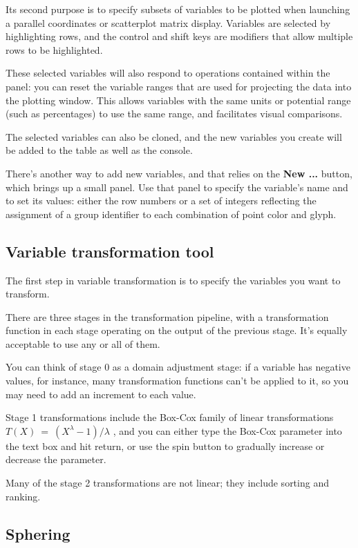 \documentclass[11pt]{article}
\def\Widget#1{\textbf{#1}}
\begin{document}
Its second purpose is to specify subsets of variables to be plotted
when launching a parallel coordinates or scatterplot matrix display.
Variables are selected by highlighting rows, and the control and shift
keys are modifiers that allow multiple rows to be highlighted.

These selected variables will also respond to operations contained
within the panel:  you can reset the variable ranges that are used
for projecting the data into the plotting window.  This allows
variables with the same units or potential range (such as percentages)
to use the same range, and facilitates visual comparisons.

The selected variables can also be cloned, and the new variables
you create will be added to the table as well as the console.

\label{NewVariable}
There's another way to add new variables, and that relies on the
\Widget{New ...} button, which brings up a small panel.  Use that
panel to specify the variable's name and to set its values: either the
row numbers or a set of integers reflecting the assignment of a group
identifier to each combination of point color and glyph.

\subsection{Variable transformation tool}
\label{slbl:VarTransform}

The first step in variable transformation is to specify the variables
you want to transform.

There are three stages in the transformation pipeline, with a
transformation function in each stage operating on the output of the
previous stage.  It's equally acceptable to use any or all of them.

You can think of stage 0 as a domain adjustment stage:  if a variable
has negative values, for instance, many transformation functions
can't be applied to it, so you may need to add an increment to each
value.

Stage 1 transformations include the Box-Cox family of linear
transformations \( T(X)~=~(X ^ \lambda - 1) / \lambda\) \cite{BoxCox64},
and you can either type the Box-Cox parameter into
the text box and hit return, or use the spin button to gradually
increase or decrease the parameter. 

Many of the stage 2
transformations are not linear; they include sorting and ranking.

\subsection{Sphering}
\label{slbl:Sphering}
\end{document}
